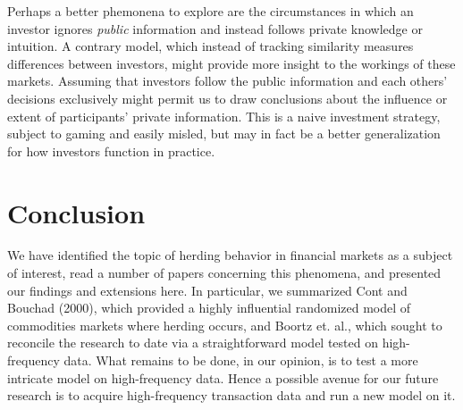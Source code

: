 \documentclass{article}
\begin{document}
Perhaps a better phemonena to explore are the circumstances in which an investor ignores \emph{public} information and instead follows private knowledge or intuition.
A contrary model, which instead of tracking similarity measures differences between investors, might provide more insight to the workings of these markets.  
Assuming that investors follow the public information and each others' decisions exclusively might permit us to draw conclusions about the influence or extent of participants' private information.
This is a naive investment strategy, subject to gaming and easily misled, but may in fact be a better generalization for how investors function in practice.


\section{Conclusion}
We have identified the topic of herding behavior in financial markets as a subject of interest, read a number of papers concerning this phenomena, and presented our findings and extensions here.
In particular, we summarized Cont and Bouchad (2000), which provided a highly influential randomized model of commodities markets where herding occurs, and Boortz et. al., which sought to reconcile the research to date via a straightforward model tested on high-frequency data.
What remains to be done, in our opinion, is to test a more intricate model on high-frequency data.
Hence a possible avenue for our future research is to acquire high-frequency transaction data and run a new model on it.



\end{document}
